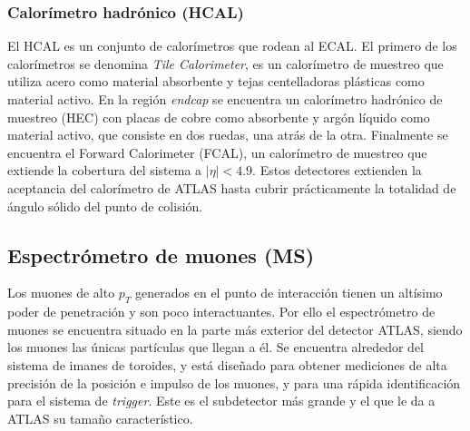 \subsubsection{Calorímetro hadrónico (HCAL)}

El HCAL es un conjunto de calorímetros que rodean al ECAL. El primero de los calorímetros se denomina \textit{Tile Calorimeter}, es un calorímetro de muestreo que utiliza acero como material absorbente y tejas centelladoras plásticas como material activo. En la región \textit{endcap} se encuentra un calorímetro hadrónico de muestreo (HEC) con placas de cobre como absorbente y argón líquido como material activo, que consiste en dos ruedas, una atrás de la otra. Finalmente se encuentra el Forward Calorimeter (FCAL), un calorímetro de muestreo que extiende la cobertura del sistema a $|\eta|<4.9$. Estos detectores extienden la aceptancia del calorímetro de ATLAS hasta cubrir prácticamente la totalidad de ángulo sólido del punto de colisión.


\subsection{Espectrómetro de muones (MS)}

Los muones de alto $p_{T}$ generados en el punto de interacción tienen un altísimo poder de penetración y son poco interactuantes. Por ello el espectrómetro de muones se encuentra situado en la parte más exterior del detector ATLAS, siendo los muones las únicas partículas que llegan a él. Se encuentra alrededor del sistema de imanes de toroides, y está diseñado para obtener mediciones de alta precisión de la posición e impulso de los muones, y para una rápida identificación para el sistema de \textit{trigger}. Este es el subdetector más grande y el que le da a ATLAS su tamaño característico. 

